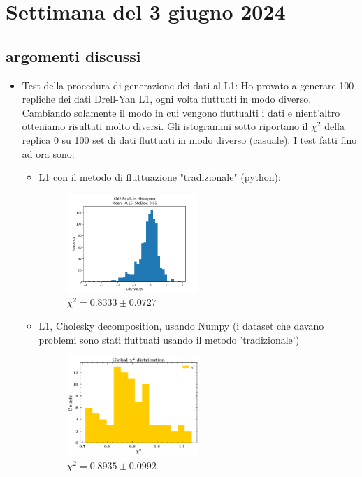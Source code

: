 \documentclass{article}
\begin{document}
\section{Settimana del 3 giugno 2024}
\subsection{argomenti discussi}
\begin{itemize}
    \item Test della procedura di generazione dei dati al L1:
    Ho provato a generare 100 repliche dei dati Drell-Yan L1, ogni volta fluttuati in modo diverso. Cambiando solamente il modo in cui vengono fluttualti i dati e nient'altro otteniamo risultati molto diversi. Gli istogrammi sotto riportano il $\chi^2$ della replica 0 su 100 set di dati fluttuati in modo diverso (casuale). I test fatti fino ad ora sono:
    \begin{itemize}
        \item L1 con il metodo di fluttuazione "tradizionale" (python):
        \begin{figure}[H]
        \centering
        \includegraphics[width=0.5\textwidth]{Images/D0_X^2_distribution.png}
        \caption{$\chi^2 = 0.8333 \pm 0.0727$ }
        \label{fig:enter-label}
        \end{figure}

        \item L1, Cholesky decomposition, usando Numpy (i dataset che davano problemi sono stati fluttuati usando il metodo 'tradizionale')
        
        \begin{figure}[H]
        \centering
        \includegraphics[width=0.5\textwidth]{Images/Globalchi2Numpy.png}
        \caption{$\chi^2 = 0.8935 \pm 0.0992$ }
        \label{fig:enter-label}
        \end{figure} 


\end{itemize}
\end{itemize}
\end{document}
